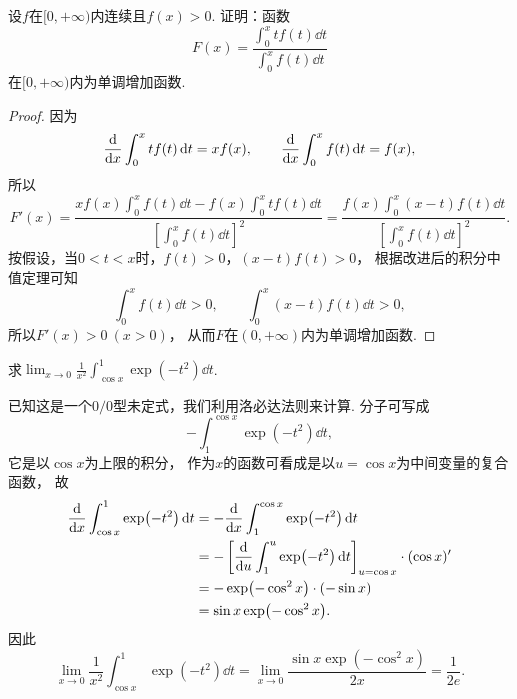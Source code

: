

\begin{example}
\def\fu{\displaystyle \int_0^x t f(t) \dd{t}}
\def\fv{\displaystyle \int_0^x f(t) \dd{t}}
\def\fvv{\left[ \fv \right]^2}
\def\fw{\displaystyle \int_0^x (x-t) f(t) \dd{t}}
设\(f\)在\([0,+\infty)\)内连续且\(f(x) > 0\).
证明：函数\[
	F(x) = \frac{\fu}{\fv}
\]在\([0,+\infty)\)内为单调增加函数.
\begin{proof}
因为\[
	\dv{x} \fu = x f(x),
	\qquad
	\dv{x} \fv = f(x),
\]
所以\[
	F'(x) = \frac{x f(x) \fv - f(x) \fu}{\fvv}
	= \frac{f(x) \fw}{\fvv}.
\]
按假设，当\(0 < t < x\)时，\(f(t) > 0\)，\((x-t) f(t) > 0\)，
根据改进后的积分中值定理可知\[
	\fv > 0, \qquad \fw > 0,
\]
所以\(F'(x) > 0\ (x > 0)\)，
从而\(F\)在\((0,+\infty)\)内为单调增加函数.
\end{proof}
\end{example}

\begin{example}
求\(\lim_{x\to0} \frac1{x^2} \int_{\cos x}^1 \exp(-t^2) \dd{t}\).
\begin{solution}
已知这是一个\(0/0\)型未定式，我们利用洛必达法则来计算.
分子可写成\[
	- \int_1^{\cos x} \exp(-t^2) \dd{t},
\]
它是以\(\cos x\)为上限的积分，
作为\(x\)的函数可看成是以\(u = \cos x\)为中间变量的复合函数，
故\begin{align*}
	\dv{x} \int_{\cos x}^1 \exp(-t^2) \dd{t}
	&= -\dv{x} \int_1^{\cos x} \exp(-t^2) \dd{t} \\
	&= -\left[ \dv{u}\int_1^u \exp(-t^2) \dd{t} \right]_{u=\cos x} \cdot (\cos x)' \\
	&= -\exp(-\cos^2 x) \cdot (-\sin x) \\
	&= \sin x \exp(-\cos^2 x).
\end{align*}
因此\[
	\lim_{x\to0} \frac1{x^2} \int_{\cos x}^1 \exp(-t^2) \dd{t}
	= \lim_{x\to0} \frac{\sin x \exp(-\cos^2 x)}{2x}
	= \frac1{2e}.
\]
\end{solution}
\end{example}

